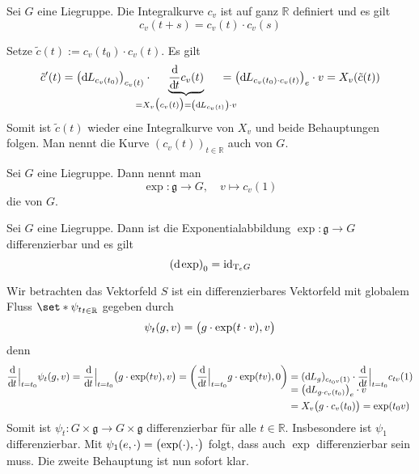 \begin{lemma}[label=lem:127,{name=[Integralkurven sind Einparameteruntergruppen von $G$]}]
	Sei $G$ eine Liegruppe.
	Die Integralkurve $c_v$ ist auf ganz $\mathbb{R}$ definiert und es gilt 
	\[
		c_v(t+s) = c_v(t) \cdot c_v(s)
	\]
\end{lemma}
\begin{beweis}
	Setze $\tilde{c}(t) := c_v(t_0) \cdot c_v(t)$.
	Es gilt 
	\begin{align}
		\tilde{c}'(t) = \enbrace*{\mathd L_{c_v(t_0)}}_{c_v(t)}  \cdot \hspace{-1.5em}\Underbrace{\diffd{}{t} c_v(t)}{= X_v \enbrace[\big]{c_v(t)} = \enbrace*{\mathd L_{c_v(t)}} \cdot v} \hspace{-1.5em}= \enbrace*{\mathd L_{c_v(t_0) \cdot c_v(t)}}_e \cdot v = X_v \enbrace*{\tilde{c}(t)}
	\end{align}
	Somit ist $\tilde{c}(t)$ wieder eine Integralkurve von $X_v$ und beide Behauptungen folgen.
	Man nennt die Kurve $(c_v(t))_{t \in \mathbb{R}}$ auch  von $G$.
\end{beweis}

\begin{definition}[{name=[Exponentialabbildung]}]
	Sei $G$ eine Liegruppe.
	Dann nennt man 
	\[
		\exp \colon \mathfrak{g} \longrightarrow G ,\quad  v \longmapsto c_v(1)
	\]
	die  von $G$. 
\end{definition}

\begin{lemma}[{name=[{Differenzierbarkeit der Exponentialabbildung}]}]
	Sei $G$ eine Liegruppe.
	Dann ist die Exponentialabbildung $\exp \colon \mathfrak{g} \to G$ differenzierbar und es gilt 
	\[
		\enbrace*{\mathd \exp}_0 = \id_{\Tmap_e G}
	\]
\end{lemma}
\begin{beweis}
	Wir betrachten das Vektorfeld
	$S$ ist ein differenzierbares Vektorfeld mit globalem Fluss $\set*{\psi_t}_{t \in \mathbb{R}}$ gegeben durch 
	\[
		\psi_t(g,v) = \enbrace[\big]{g \cdot \exp(t \cdot v),v}
	\]
	denn
	\begin{align}
		\diffd{}{t}\Big|_{t=t_0} \psi_t (g,v) = \diffd{}{t}\Big|_{t=t_0} \enbrace[\big]{g \cdot \exp(tv),v} = \enbrace*{\diffd{}{t}\Big|_{t=t_0} g \cdot \exp(tv),0} &= (\mathd L_g)_{c_{t_0 v}(1)} \cdot \diffd{}{t}\Big|_{t=t_0} c_{tv}(1) \\[-9pt]
		&= \enbrace*{\mathd L_{g \cdot c_v(t_0)}}_e \cdot v \\
		&= X_v \enbrace[\big]{g \cdot c_v(t_0)} = \exp(t_0 v)
	\end{align}
	Somit ist $\psi_t \colon G \times \mathfrak{g} \to G \times \mathfrak{g}$ differenzierbar für alle $t \in \mathbb{R}$.
	Insbesondere ist $\psi_1$ differenzierbar.
	Mit $\psi_1(e,\cdot ) = \enbrace[\big]{\exp(\cdot ), \cdot }$ folgt, dass auch $\exp$ differenzierbar sein muss.
	Die zweite Behauptung ist nun sofort klar.
\end{beweis}


